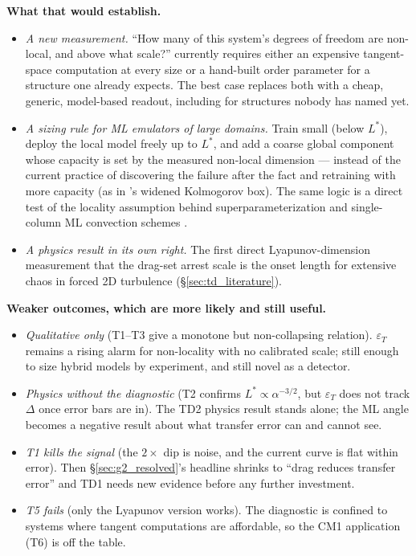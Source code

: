 \documentclass[11pt]{article}
\begin{document}
\textbf{What that would establish.}
\begin{itemize}[nosep]
\item \emph{A new measurement.} ``How many of this system's degrees of
  freedom are non-local, and above what scale?'' currently requires either
  an expensive tangent-space computation at every size or a hand-built
  order parameter for a structure one already expects. The best case
  replaces both with a cheap, generic, model-based readout, including for
  structures nobody has named yet.
\item \emph{A sizing rule for ML emulators of large domains.} Train small
  (below $L^*$), deploy the local model freely up to $L^*$, and add a
  coarse global component whose capacity is set by the measured non-local
  dimension --- instead of the current practice of discovering the
  failure after the fact and retraining with more capacity (as in
  \cite{constanteamores2024}'s widened Kolmogorov box). The same logic is a
  direct test of the locality assumption behind superparameterization and
  single-column ML convection schemes \cite{wangyuvalogorman2022}.
\item \emph{A physics result in its own right.} The first direct
  Lyapunov-dimension measurement that the drag-set arrest scale is the
  onset length for extensive chaos in forced 2D turbulence
  (\S\ref{sec:td_literature}).
\end{itemize}

\textbf{Weaker outcomes, which are more likely and still useful.}
\begin{itemize}[nosep]
\item \emph{Qualitative only} (T1--T3 give a monotone but non-collapsing
  relation). $\varepsilon_T$ remains a rising alarm for non-locality with
  no calibrated scale; still enough to size hybrid models by experiment,
  and still novel as a detector.
\item \emph{Physics without the diagnostic} (T2 confirms
  $L^*\propto\alpha^{-3/2}$, but $\varepsilon_T$ does not track $\Delta$
  once error bars are in). The TD2 physics result stands alone; the ML
  angle becomes a negative result about what transfer error can and
  cannot see.
\item \emph{T1 kills the signal} (the $2\times$ dip is noise, and the
  current curve is flat within error). Then \S\ref{sec:g2_resolved}'s
  headline shrinks to ``drag reduces transfer error'' and TD1 needs new
  evidence before any further investment.
\item \emph{T5 fails} (only the Lyapunov version works). The diagnostic is
  confined to systems where tangent computations are affordable, so the
  CM1 application (T6) is off the table.
\end{itemize}
\end{document}
